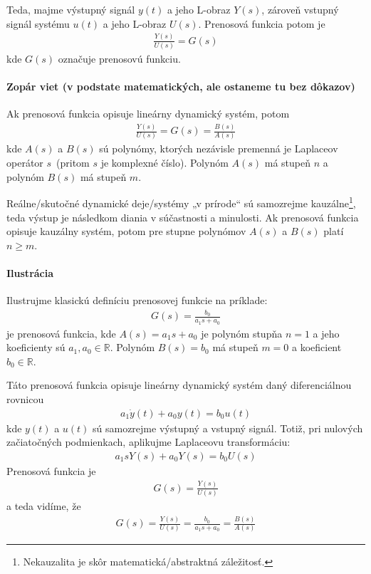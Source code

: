 \documentclass[a4paper, 10pt, ]{article}
\begin{document}
Teda, majme výstupný signál $y(t)$ a jeho L-obraz $Y(s)$, zároveň vstupný signál systému $u(t)$ a jeho L-obraz $U(s)$. Prenosová funkcia potom je
\begin{align}
	\frac{Y(s)}{U(s)} = G(s)
\end{align}
kde $G(s)$ označuje prenosovú funkciu.


\paragraph{Zopár viet {\color{Gray} \small (v podstate matematických, ale ostaneme tu bez dôkazov)}}

Ak prenosová funkcia opisuje lineárny dynamický systém, potom
\begin{align}
	\frac{Y(s)}{U(s)} = G(s) = \frac{B(s)}{A(s)}
\end{align}
kde $A(s)$ a $B(s)$ sú polynómy, ktorých nezávisle premenná je Laplaceov operátor $s$~(pritom $s$ je komplexné číslo). Polynóm $A(s)$ má stupeň $n$ a polynóm $B(s)$ má stupeň $m$.

Reálne/skutočné dynamické deje/systémy „v prírode“ sú samozrejme kauzálne\footnote{Nekauzalita je skôr matematická/abstraktná záležitosť.}, teda výstup je následkom diania v súčastnosti a minulosti. Ak prenosová funkcia opisuje kauzálny systém, potom pre stupne polynómov $A(s)$ a $B(s)$ platí $n \geq m$.


\paragraph{Ilustrácia}

Ilustrujme klasickú definíciu prenosovej funkcie na príklade:
\begin{align}
	G(s) = \frac{b_0}{a_1 s + a_0}
\end{align}
je prenosová funkcia, kde $A(s) = a_1 s + a_0$ je polynóm stupňa $n = 1$ a jeho koeficienty sú $a_1, a_0 \in \mathbb R$. Polynóm $B(s) = b_0$ má stupeň $m=0$ a koeficient $b_0 \in \mathbb R$.

Táto prenosová funkcia opisuje lineárny dynamický systém daný diferenciálnou rovnicou
\begin{align}
	a_1 \dot y(t) + a_0 y(t) = b_0 u(t)
\end{align}
kde $y(t)$ a $u(t)$ sú samozrejme výstupný a vstupný signál. Totiž, pri nulových začiatočných podmienkach, aplikujme Laplaceovu transformáciu:
\begin{align}
	a_1 s Y(s) + a_0 Y(s) = b_0 U(s)
\end{align}
Prenosová funkcia je
\begin{align}
	G(s) = \frac{Y(s)}{U(s)}
\end{align}
a teda vidíme, že
\begin{align}
	G(s) = \frac{Y(s)}{U(s)} =  \frac{b_0}{a_1 s + a_0} = \frac{B(s)}{A(s)}
\end{align}
\end{document}
